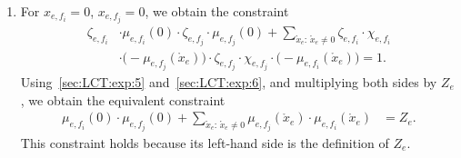 \documentclass[journal]{IEEEtran}
\newcommand{\add}[1]{{\color{black}#1}}
\newcommand{\LCT}[1]{ \mathring{#1} }
\newcommand{\efi}{ e,f_i }
\newcommand{\efj}{ e,f_j }
\begin{document}
\begin{appendices}
\begin{enumerate}
    \item For $x_{\efi} = 0$, $x_{\efj} = 0$, we obtain the constraint
          \begin{align*}
            \zeta_{\efi}
             & \cdot
            \mu_{\efi}(0)
            \cdot
            \zeta_{\efj}
            \cdot
            \mu_{\efj}(0)
            +
            \sum_{\LCT{x}_e: \, \LCT{x}_e \neq 0}
            \zeta_{\efi}
            \cdot
            \chi_{\efi}
            \\
             & \cdot
            \bigl( - \mu_{\efj}(\LCT{x}_e) \bigr)
            \cdot
            \zeta_{\efj}
            \cdot
            \chi_{\efj} \cdot
            \bigl( - \mu_{\efi}(\LCT{x}_e) \bigr)
            = 1.
          \end{align*}
          Using~\eqref{sec:LCT:exp:5}
          and~\eqref{sec:LCT:exp:6}, and multiplying both sides by
          $Z_e$, we obtain the equivalent constraint
          \begin{align*}
            \mu_{\efi}(0)
            \cdot
            \mu_{\efj}(0)
            +
            \sum_{\LCT{x}_e: \, \LCT{x}_e \neq 0}
            \mu_{\efj}(\LCT{x}_e)
            \cdot
            \mu_{\efi}(\LCT{x}_e)
             & = Z_e.
          \end{align*}
          \add{This constraint holds because its left-hand side is the
            definition of $Z_e$.}


\end{enumerate}
\end{appendices}
\end{document}
